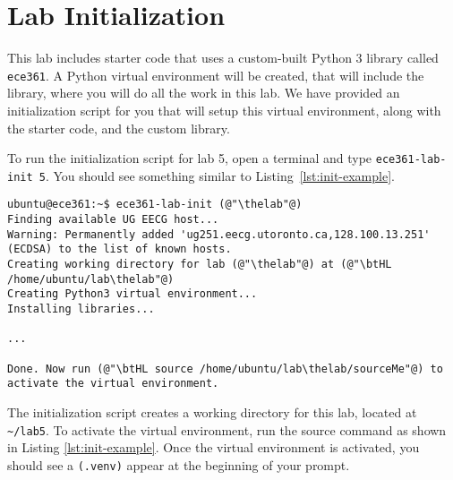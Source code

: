 \documentclass[11pt]{article}
\def\thelab{5}
\begin{document}
\section{Lab Initialization}
\label{sec:lab-init}

This lab includes starter code that uses a custom-built Python 3 library called \texttt{ece361}.
A Python virtual environment will be created, that will include the library, where you will do all the work in this lab.
We have provided an initialization script for you that will setup this virtual environment, along with the starter code, and the custom library.


To run the initialization script for lab \thelab, open a terminal and type \texttt{ece361-lab-init \thelab}.
You should see something similar to Listing~\ref{lst:init-example}.

\begin{lstlisting}[style=ece361shell, caption={Initializing lab \thelab.}, label={lst:init-example}]
ubuntu@ece361:~$ ece361-lab-init (@"\thelab"@)
Finding available UG EECG host...
Warning: Permanently added 'ug251.eecg.utoronto.ca,128.100.13.251' (ECDSA) to the list of known hosts.
Creating working directory for lab (@"\thelab"@) at (@"\btHL /home/ubuntu/lab\thelab"@)
Creating Python3 virtual environment...
Installing libraries...

...

Done. Now run (@"\btHL source /home/ubuntu/lab\thelab/sourceMe"@) to activate the virtual environment.
\end{lstlisting}

The initialization script creates a working directory for this lab, located at \texttt{\textasciitilde/lab\thelab}.
To activate the virtual environment, run the source command as shown in Listing \ref{lst:init-example}.
Once the virtual environment is activated, you should see a \texttt{(.venv)} appear at the beginning of your prompt.


\end{document}

